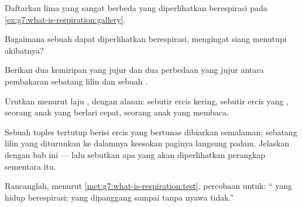 \begin{exercise}[$\star$]\label{exo:g7:what-is-respiration:5}
Daftarkan lima  yang sangat berbeda yang diperlihatkan
berespirasi pada \cref{ex:g7:what-is-respiration:gallery}.
\end{exercise}

\begin{exercise}[$\star$]\label{exo:g7:what-is-respiration:6}
Bagaimana sebuah  dapat diperlihatkan berespirasi, mengingat
 siang menutupi akibatnya?
\end{exercise}

\begin{exercise}[$\star\star$]\label{exo:g7:what-is-respiration:7}
Berikan dua kemiripan yang jujur dan dua perbedaan yang jujur antara
pembakaran sebatang lilin dan  sebuah .
\end{exercise}

\begin{exercise}[$\star\star$]\label{exo:g7:what-is-respiration:8}
Urutkan menurut laju , dengan alasan: sebutir ercis
kering, sebutir ercis yang , seorang anak yang berlari
cepat, seorang anak yang membaca.
\end{exercise}

\begin{exercise}[$\star\star$]\label{exo:g7:what-is-respiration:9}
Sebuah toples tertutup berisi ercis yang bertunas dibiarkan semalaman;
sebatang lilin yang diturunkan ke dalamnya keesokan paginya langsung
padam. Jelaskan dengan bab ini --- lalu sebutkan apa yang akan
diperlihatkan perangkap  sementara itu.
\end{exercise}

\begin{exercise}[$\star\star$]\label{exo:g7:what-is-respiration:10}
Rancanglah, menurut \cref{met:g7:what-is-respiration:test}, percobaan
untuk: `` yang hidup berespirasi;  yang dipanggang sampai
tanpa nyawa tidak.''
\end{exercise}

